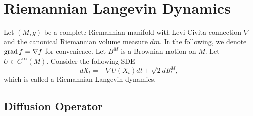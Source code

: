 \chapter{Riemannian Langevin Dynamics}

Let $(M,g)$ be a complete Riemannian manifold with Levi-Civita connection $\nabla$ and the canonical Riemannian volume measure $dm$. In the following, we denote $\operatorname{grad} f = \nabla f$ for convenience. Let $B^M$ is a Brownian motion on $M$. Let $U \in C^\infty(M)$. Consider the following SDE
\begin{equation}\label{eq:RLD}
    dX_t = -\nabla U(X_t) dt + \sqrt{2}dB^M_t,
\end{equation}
which is called a Riemannian Langevin dynamics.

\section{Diffusion Operator}

